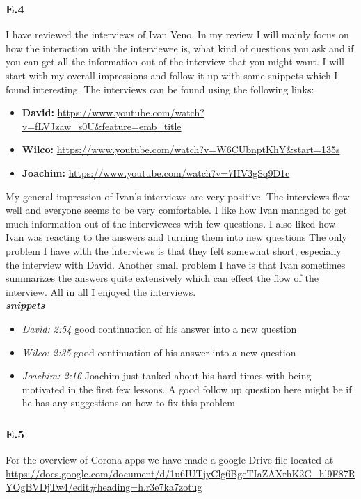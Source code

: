 \documentclass[]{article}
\begin{document}
\subsubsection*{E.4}
I have reviewed the interviews of Ivan Veno. In my review I will mainly focus 
on how the interaction with the interviewee is, what kind of questions you ask 
and if you can get all the information out of the interview that you might want. 
I will start with my overall impressions and follow it up with some snippets which 
I found interesting. The interviews can be found using the following links:
\begin{itemize}
    \item[] \textbf{David: } \url{https://www.youtube.com/watch?v=fLVJzaw_s0U&feature=emb_title}
    \item[] \textbf{Wilco: } \url{https://www.youtube.com/watch?v=W6CUbnptKhY&start=135s}
    \item[] \textbf{Joachim: } \url{https://www.youtube.com/watch?v=7HV3gSq9D1c}
\end{itemize}
My general impression of Ivan's interviews are very positive. The interviews
flow well and everyone seems to be very comfortable. I like how Ivan managed 
to get much information out of the interviewees with few questions. 
I also liked how Ivan was reacting to the answers and turning them into new questions
The only problem I have with the interviews is that they felt somewhat short, especially the interview with David. 
Another small problem I have is that Ivan sometimes summarizes the answers quite extensively which can effect the flow of the interview.
All in all I enjoyed the interviews.\\
\textbf{\textit{snippets}}
\begin{itemize}
    \item [] \textit{David: 2:54} good continuation of his answer into a new question
    \item [] \textit{Wilco: 2:35} good continuation of his answer into a new question
    \item [] \textit{Joachim: 2:16} Joachim just tanked about his hard times with being motivated 
                in the first few lessons. A good follow up question here might be if he has any suggestions
                on how to fix this problem
\end{itemize} 

\subsubsection*{E.5}
For the overview of Corona apps we have made a google Drive file located at
\url{https://docs.google.com/document/d/1u6IUTjyClg6BgeTIaZAXrhK2G_hl9F87RYOgBVDjTw4/edit#heading=h.r3e7ka7zotug}
\end{document}
